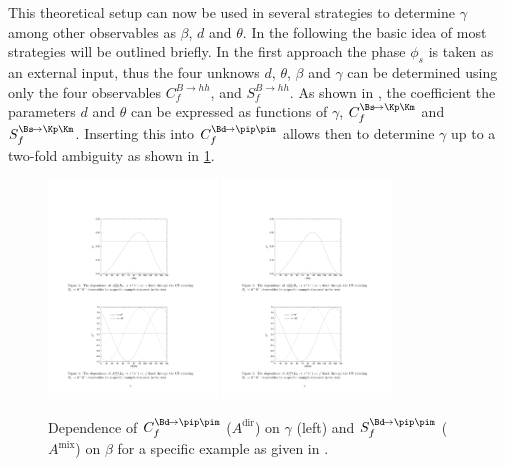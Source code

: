 This theoretical setup can now be used in several strategies to determine $\gamma$ among other observables as $\beta$, $d$ and $\theta$.
In the following the basic idea of most strategies will be outlined briefly.
In the first approach the phase $\phi_s$ is taken as an external input, thus the four unknows $d$, $\theta$, $\beta$ and $\gamma$ can be determined using only the four observables $C_{f}^{B\!\to hh}$, and $S_{f}^{B\!\to hh}$.
As shown in \cite{GammaInLoops_Fleischer}, the coefficient the parameters $d$ and $\theta$ can be expressed as functions of $\gamma$, $C_{f}^{\Bs\!\to\Kp\Km}$ and $S_{f}^{\Bs\!\to\Kp\Km}$.
Inserting this into $C_{f}^{\Bd\!\to\pip\pim}$ allows then to determine $\gamma$ up to a two-fold ambiguity as shown in \cref{fig:gamma_beta_fleischer}.
\begin{figure}[tbp]
	\centering
	\includegraphics[width=0.4\textwidth]{04gamma/figs/GammaVsCf.pdf}
	\includegraphics[width=0.4\textwidth]{04gamma/figs/BetaVsSf.pdf}
	\caption{Dependence of $C_{f}^{\Bd\!\to\pip\pim}$ ($A^{\text{dir}}$) on $\gamma$ (left) and $S_{f}^{\Bd\!\to\pip\pim}$ ($A^{\text{mix}}$) on $\beta$ for a specific example as given in \cite{GammaInLoops_Fleischer}.}
	\label{fig:gamma_beta_fleischer}
\end{figure}
